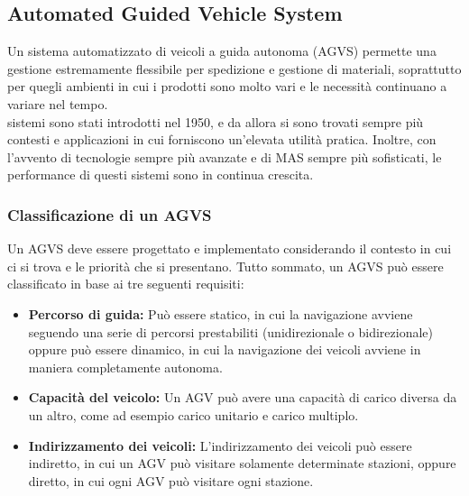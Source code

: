 \documentclass[12pt]{article}
\begin{document}
\newpage

\subsection{Automated Guided Vehicle System}
\noindent Un sistema automatizzato di veicoli a guida autonoma (AGVS) permette una gestione estremamente flessibile per spedizione e gestione di materiali, soprattutto per quegli ambienti in cui i prodotti sono molto vari e le necessità continuano a variare nel tempo. \\

\noindentQuesti sistemi sono stati introdotti nel 1950, e da allora si sono trovati sempre più contesti e applicazioni in cui forniscono un'elevata utilità pratica. Inoltre, con l'avvento di tecnologie sempre più avanzate e di MAS sempre più sofisticati, le performance di questi sistemi sono in continua crescita.

\subsubsection{Classificazione di un AGVS}
Un AGVS deve essere progettato e implementato considerando il contesto in cui ci si trova e le priorità che si presentano. Tutto sommato, un AGVS può essere classificato in base ai tre seguenti requisiti:
\begin{itemize}
\item \textbf{Percorso di guida:} Può essere statico, in cui la navigazione avviene seguendo una serie di percorsi prestabiliti (unidirezionale o bidirezionale) oppure può essere dinamico, in cui la navigazione dei veicoli avviene in maniera completamente autonoma.

\item \textbf{Capacità del veicolo:} Un AGV può avere una capacità di carico diversa da un altro, come ad esempio carico unitario e carico multiplo.

\item \textbf{Indirizzamento dei veicoli:} L'indirizzamento dei veicoli può essere indiretto, in cui un AGV può visitare solamente determinate stazioni, oppure diretto, in cui ogni AGV può visitare ogni stazione.

\end{itemize}
\end{document}
